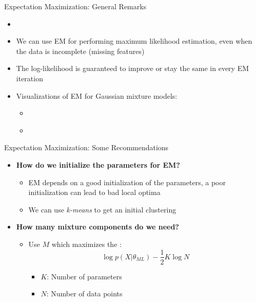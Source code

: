 \begin{frame}{Expectation Maximization: General Remarks}{}
	\begin{itemize}
		\item {}
		\item We can use EM for performing maximum likelihood estimation, even when the data is incomplete (missing features)
		\item The log-likelihood is guaranteed to improve or stay the same in every EM iteration 
		\item Visualizations of EM for Gaussian mixture models:
		\begin{itemize}
			\item \href{https://www.youtube.com/watch?v=l1W3BvjJnmY}{}
			\item \href{https://youtu.be/eXdGCO-2n90?t=2}{}
		\end{itemize}
	\end{itemize}
\end{frame}


\begin{frame}{Expectation Maximization: Some Recommendations}{}
	\begin{itemize}
		\item \textbf{How do we initialize the parameters for EM?}
		\begin{itemize}
			\item EM depends on a good initialization of the parameters, a poor initialization can lead to bad local optima
			\item We can use \textit{k-means} to get an initial clustering
		\end{itemize}
		\item \textbf{How many mixture components do we need?}
		\begin{itemize}
			\item Use $M$ which maximizes the :
			\begin{equation}
				\log p(X|\theta_{ML}) - \frac{1}{2} K \log N
			\end{equation}
			\vspace*{-2mm}
			\begin{itemize}
				\item $K$: Number of parameters
				\item $N$: Number of data points
			\end{itemize}
		\end{itemize}
	\end{itemize}
\end{frame}



